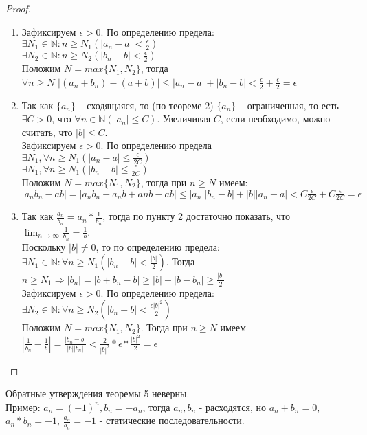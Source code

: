     \begin{proof} \
        \begin{enumerate}
        \item Зафиксируем $\epsilon > 0$. По определению предела:\\
            $\exists N_1 \in \mathds{N} : n \geq N_1 (|a_{n}-a| < \frac{\epsilon}{2})$\\
            $\exists N_2 \in \mathds{N} : n \geq N_2 (|b_{n}-b| < \frac{\epsilon}{2})$\\
            Положим $N = max\{N_1, N_2\}$, тогда\\
            $\forall n \geq N$ $|(a_{n} + b_{n}) - (a + b)| \leq |a_{n} - a| + |b_{n} - b| < \frac{\epsilon}{2} + \frac{\epsilon}{2} = \epsilon$
        
        \item Так как $\{a_{n}\}$ -- сходящаяся, то (по теореме 2) $\{a_{n}\}$ -- ограниченная, то есть $\exists C > 0$, что $\forall n \in \mathds{N}(|a_{n}| \leq C)$. Увеличивая $C$, если необходимо, можно считать, что $|b| \leq C$.\\
            Зафиксируем $\epsilon > 0$. По определению предела\\
            $\exists N_1, \forall n \geq N_1(|a_{n} - a| \leq \frac{\epsilon}{2C})$\\
            $\exists N_1, \forall n \geq N_1(|b_{n} - b| \leq \frac{\epsilon}{2C})$\\
            Положим $N = max\{N_1, N_2\}$, тогда при $n \geq N$ имеем:\\
            $|a_{n}b_{n} - ab| = |a_{n}b_{n} - a_{n}b + a{n}b - ab| \leq |a_{n}||b_{n} - b| + |b||a_{n} - a| < C\frac{\epsilon}{2C} + C\frac{\epsilon}{2C} = \epsilon$
   
        \item Так как $\frac{a_{n}}{b_{n}} = a_{n} * \frac{1}{b_{n}}$, тогда по пункту 2 достаточно показать, что $\lim_{n \to \infty} \frac{1}{b_{n}} = \frac{1}{b}$.\\
            Поскольку $|b| \neq 0$, то по определению предела:\\
            $\exists N_1 \in \mathds{N} : \forall n \geq N_1 (|b_{n} - b| < \frac{|b|}{2})$. Тогда $n \geq N_1 \Rightarrow |b_{n}| = |b + b_{n} - b| \geq |b| - |b - b_{n}| \geq \frac{|b|}{2}$\\
            Зафиксируем $\epsilon > 0$. По определению предела:\\
            $\exists N_2 \in \mathds{N} : \forall n \geq N_2 (|b_{n} - b| < \frac{\epsilon|b|^2}{2})$\\
            Положим $N = max\{N_1, N_2\}$. Тогда при $n \geq N$ имеем $|\frac{1}{b_{n}} - \frac{1}{b}| = \frac{|b_{n} - b|}{|b||b_{n}|} < \frac{2}{|b|^2} * \epsilon * \frac{|b|^2}{2} = \epsilon$
        \end{enumerate}
    \end{proof}

    \begin{note}
        Обратные утверждения теоремы 5 неверны.\\
        Пример: $a_{n} = (-1)^{n}, b_{n} = -a_{n}$, тогда $a_{n}, b_{n}$ - расходятся, но $a_{n} + b_{n} = 0$, $a_{n} * b_{n} = -1$, $\frac{a_{n}}{b_{n}} = -1$ - статические последовательности.
    \end{note}